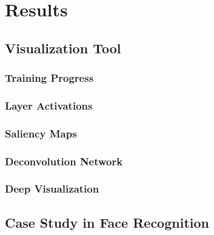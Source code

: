 
\chapter{Results}

\section{Visualization Tool}

\subsection{Training Progress}

\subsection{Layer Activations}

\subsection{Saliency Maps}

\subsection{Deconvolution Network}

\subsection{Deep Visualization}

\section{Case Study in Face Recognition}

\cleardoublepage